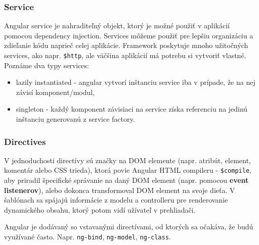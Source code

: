 \subsubsection{Service}
Angular service je nahraditeľný objekt, ktorý je možné použiť v aplikácií pomocou dependency injection. Services môžeme použiť pre lepšiu organizáciu a zdieľanie kódu naprieč celej aplikácie. Framework poskytuje mnoho užitočných services, ako napr. \verb|$http|, ale väčšina aplikácií má potrebu si vytvoriť vlastné.\cite{angular-docs}
Poznáme dva typy services:
\begin{itemize}
\item lazily instantiated - angular vytvorí inštanciu service iba v prípade, že na nej závisí komponent/modul,
\item singleton - každý komponent závisiaci na service získa referenciu na jedinú inštanciu generovanú z service factory.
\end{itemize}

\subsubsection{Directives}
V jednoduchosti directívy sú značky na DOM elemente (napr. atribút, element, komentár alebo CSS trieda), ktorá povie Angular HTML compileru - \verb|$compile|, aby priradil špecifické správanie na daný DOM element (napr. pomocou \textbf{event listenerov}), alebo dokonca transformoval DOM element na svoje dieťa. V šablónach sa spájajú informácie z modelu a controlleru pre renderovanie dynamického obsahu, ktorý potom vidí užívateľ v prehliadači.

Angular je dodávaný so vstavanými directívami, od ktorých sa očakáva, že budú využívané často. Napr. \verb|ng-bind|, \verb|ng-model|, \verb|ng-class|.\cite{angular-docs}


